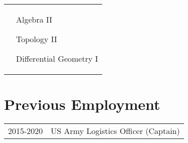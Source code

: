 \documentclass[margin,line,pifont,palatino,courier]{res}
\newenvironment{list1}{
  \begin{list}{\ding{113}}{%
      \setlength{\itemsep}{0in}
      \setlength{\parsep}{0in} \setlength{\parskip}{0in}
      \setlength{\topsep}{0in} \setlength{\partopsep}{0in}
      \setlength{\leftmargin}{0.17in}}}{\end{list}}
\begin{document}
\begin{resume}
\begin{tabular}{@{}p{2.3in}p{3in}}
\begin{list1}
  \end{list1}
  &
  \begin{list1}
  \item Algebra II
  \item Topology II
  \item Differential Geometry I
  \end{list1}

\end{tabular}

\section{\sc Previous Employment}

\begin{tabular}{@{}p{.6in}p{4in}}
2015-2020 & US Army Logistics Officer (Captain)\\
\end{tabular}








\end{resume}
\end{document}

